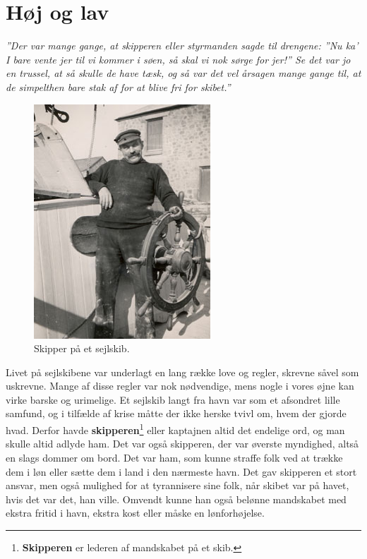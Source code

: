 
\chapter{Høj og lav}

\emph{''Der var mange gange, at skipperen eller styrmanden sagde til
drengene: ''Nu ka' I bare vente jer til vi kommer i søen, så skal vi nok
sørge for jer!'' Se det var jo en trussel, at så skulle de have tæsk, og
så var det vel årsagen mange gange til, at de simpelthen bare stak af
for at blive fri for skibet.''}

\begin{figure}
\centering
\includegraphics{images/sejlskibe_tema-3-skipper.jpg}
\caption{Skipper på et sejlskib.}
\end{figure}

Livet på sejlskibene var underlagt en lang række love og regler, skrevne
såvel som uskrevne. Mange af disse regler var nok nødvendige, mens nogle
i vores øjne kan virke barske og urimelige. Et sejlskib langt fra havn
var som et afsondret lille samfund, og i tilfælde af krise måtte der
ikke herske tvivl om, hvem der gjorde hvad. Derfor havde
\textbf{skipperen}\footnote{\textbf{Skipperen} er lederen af mandskabet
  på et skib.} eller kaptajnen altid det endelige ord, og man skulle
altid adlyde ham. Det var også skipperen, der var øverste myndighed,
altså en slags dommer om bord. Det var ham, som kunne straffe folk ved
at trække dem i løn eller sætte dem i land i den nærmeste havn. Det gav
skipperen et stort ansvar, men også mulighed for at tyrannisere sine
folk, når skibet var på havet, hvis det var det, han ville. Omvendt
kunne han også belønne mandskabet med ekstra fritid i havn, ekstra kost
eller måske en lønforhøjelse.


